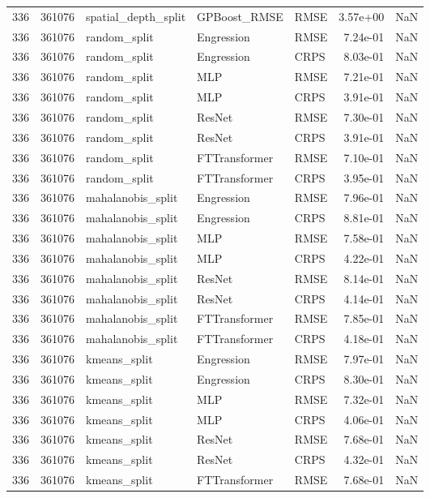 \begin{tabular}{rrlllrr}
336 & 361076 & spatial\_depth\_split & GPBoost\_RMSE & RMSE & 3.57e+00 & NaN \\
336 & 361076 & random\_split & Engression & RMSE & 7.24e-01 & NaN \\
336 & 361076 & random\_split & Engression & CRPS & 8.03e-01 & NaN \\
336 & 361076 & random\_split & MLP & RMSE & 7.21e-01 & NaN \\
336 & 361076 & random\_split & MLP & CRPS & 3.91e-01 & NaN \\
336 & 361076 & random\_split & ResNet & RMSE & 7.30e-01 & NaN \\
336 & 361076 & random\_split & ResNet & CRPS & 3.91e-01 & NaN \\
336 & 361076 & random\_split & FTTransformer & RMSE & 7.10e-01 & NaN \\
336 & 361076 & random\_split & FTTransformer & CRPS & 3.95e-01 & NaN \\
336 & 361076 & mahalanobis\_split & Engression & RMSE & 7.96e-01 & NaN \\
336 & 361076 & mahalanobis\_split & Engression & CRPS & 8.81e-01 & NaN \\
336 & 361076 & mahalanobis\_split & MLP & RMSE & 7.58e-01 & NaN \\
336 & 361076 & mahalanobis\_split & MLP & CRPS & 4.22e-01 & NaN \\
336 & 361076 & mahalanobis\_split & ResNet & RMSE & 8.14e-01 & NaN \\
336 & 361076 & mahalanobis\_split & ResNet & CRPS & 4.14e-01 & NaN \\
336 & 361076 & mahalanobis\_split & FTTransformer & RMSE & 7.85e-01 & NaN \\
336 & 361076 & mahalanobis\_split & FTTransformer & CRPS & 4.18e-01 & NaN \\
336 & 361076 & kmeans\_split & Engression & RMSE & 7.97e-01 & NaN \\
336 & 361076 & kmeans\_split & Engression & CRPS & 8.30e-01 & NaN \\
336 & 361076 & kmeans\_split & MLP & RMSE & 7.32e-01 & NaN \\
336 & 361076 & kmeans\_split & MLP & CRPS & 4.06e-01 & NaN \\
336 & 361076 & kmeans\_split & ResNet & RMSE & 7.68e-01 & NaN \\
336 & 361076 & kmeans\_split & ResNet & CRPS & 4.32e-01 & NaN \\
336 & 361076 & kmeans\_split & FTTransformer & RMSE & 7.68e-01 & NaN \\

\end{tabular}
